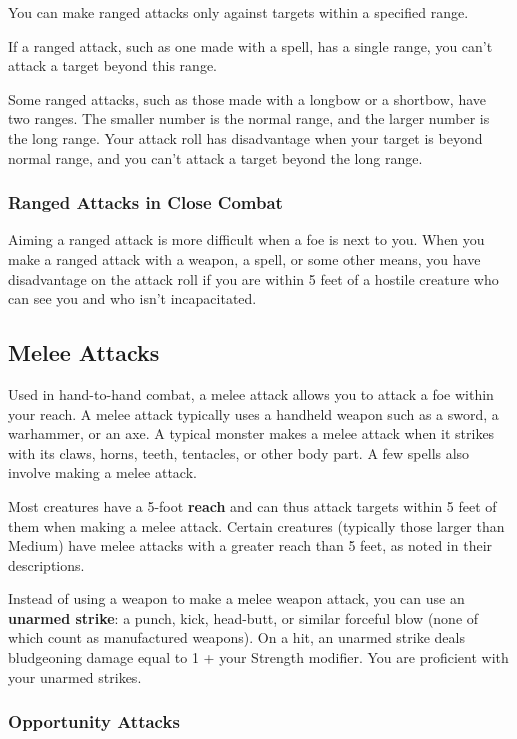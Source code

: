 You can make ranged attacks only against targets within a specified range.

If a ranged attack, such as one made with a spell, has a single range, you can't attack a target beyond this range.

Some ranged attacks, such as those made with a longbow or a shortbow, have two ranges. The smaller number is the normal range, and the larger number is the long range. Your attack roll has disadvantage when your target is beyond normal range, and you can't attack a target beyond the long range.

\subsubsection{Ranged Attacks in Close Combat}

Aiming a ranged attack is more difficult when a foe is next to you. When you make a ranged attack with a weapon, a spell, or some other means, you have disadvantage on the attack roll if you are within 5 feet of a hostile creature who can see you and who isn't incapacitated.

\subsection{Melee Attacks}

Used in hand-to-hand combat, a melee attack allows you to attack a foe within your reach. A melee attack typically uses a handheld weapon such as a sword, a warhammer, or an axe. A typical monster makes a melee attack when it strikes with its claws, horns, teeth, tentacles, or other body part. A few spells also involve making a melee attack.

Most creatures have a 5-foot \textbf{reach} and can thus attack targets within 5 feet of them when making a melee attack. Certain creatures (typically those larger than Medium) have melee attacks with a greater reach than 5 feet, as noted in their descriptions.

Instead of using a weapon to make a melee weapon attack, you can use an \textbf{unarmed strike}: a punch, kick, head-butt, or similar forceful blow (none of which count as manufactured weapons). On a hit, an unarmed strike deals bludgeoning damage equal to 1 + your Strength modifier. You are proficient with your unarmed strikes.

\subsubsection{Opportunity Attacks}

